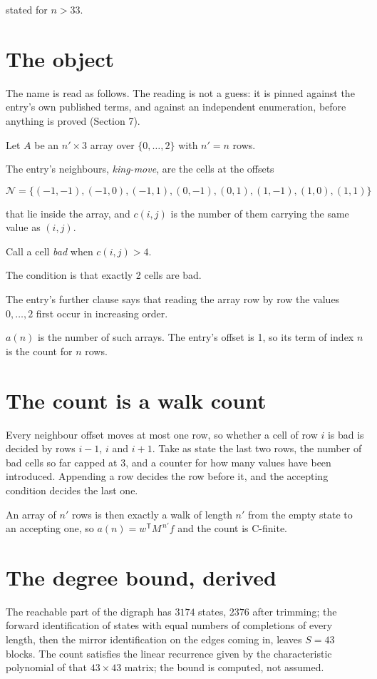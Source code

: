 \documentclass[11pt]{article}
\theoremstyle{definition}
\begin{document}
stated for $n > 33$.

\section{The object}

The name is read as follows. The reading is not a guess: it is pinned against the entry's own published terms, and against an independent enumeration, before anything is proved (Section 7).

Let $A$ be an $n' \times 3$ array over $\{0,\dots,2\}$ with $n' = n$ rows.

The entry's neighbours, {\itshape king-move}, are the cells at the offsets

\[\mathcal{N} = \{(-1,-1), (-1,0), (-1,1), (0,-1), (0,1), (1,-1), (1,0), (1,1)\}\]

that lie inside the array, and $c(i,j)$ is the number of them carrying the same value as $(i,j)$.

Call a cell {\itshape bad} when $c(i,j) > 4$.

The condition is that exactly 2 cells are bad.

The entry's further clause says that reading the array row by row the values $0,\dots,2$ first occur in increasing order.

$a(n)$ is the number of such arrays. The entry's offset is 1, so its term of index $n$ is the count for $n$ rows.

\section{The count is a walk count}

Every neighbour offset moves at most one row, so whether a cell of row $i$ is bad is decided by rows $i-1$, $i$ and $i+1$. Take as state the last two rows, the number of bad cells so far capped at 3, and a counter for how many values have been introduced. Appending a row decides the row before it, and the accepting condition decides the last one.

An array of $n'$ rows is then exactly a walk of length $n'$ from the empty state to an accepting one, so $a(n) = w^{\mathsf T}M^{\,n'}f$ and the count is C-finite.

\section{The degree bound, derived}

The reachable part of the digraph has $3174$ states, $2376$ after trimming; the forward identification of states with equal numbers of completions of every length, then the mirror identification on the edges coming in, leaves $S = 43$ blocks. The count satisfies the linear recurrence given by the characteristic polynomial of that $43\times43$ matrix; the bound is computed, not assumed.
\end{document}

